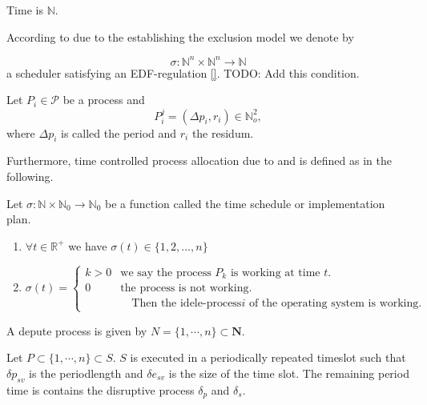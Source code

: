 \begin{definition}
	Time is $\mathbb{N}$.
\end{definition}

According to \cite[]{} due to the establishing the exclusion model we denote by

\begin{equation}
\sigma: \mathbb{N}^n \times \mathbb{N}^n\longrightarrow \mathbb{N} 
\end{equation}
a scheduler satisfying an EDF-regulation \ref{}. TODO: Add this condition.


\begin{definition}
Let $P_i\in \mathcal{P}$ be a process and 
\begin{equation}
P^j_i = ( \Delta p_i, r_i) \in \mathbb{N}_o^2,  
\end{equation}
where $\Delta p_i$ is called the period and $r_i$ the residum. 
\end{definition}
Furthermore, time controlled process allocation due to \cite{B} and \cite[p. 34]{K} is defined as in the following.

\begin{definition}
Let $\sigma: \mathbb{N} \times \mathbb{N}_0 \rightarrow \mathbb{N}_0$ be a function called the time schedule or implementation plan.
\begin{enumerate}
\item $\forall t \in \mathbb{R}^+$ we have $\sigma(t)\in \{1,2,...,n\}$
\item \begin{equation}
		\sigma(t) =
		\begin{cases}
			k > 0 & \text{we say the process $P_k$ is working at time $t$.}\\
			0 & \text{the process is not working.}\\
			  &\quad  \text{Then the idele-process$i$ of the operating system is working.}
		\end{cases}       
\end{equation}
\end{enumerate}
\end{definition}

A depute process is given by $ N = \{1, \cdots, n\}\subset \mathbf{N}$. 

Let $P \subset \{1, \cdots, n\} \subset S$.
$S$ is executed in a periodically repeated timeslot such that $\delta p_{sv}$ is the periodlength and $\delta e_{sv}$ is the size of the time slot.
The remaining period time is contains the  disruptive process $\delta_p$ and $\delta_s$.

